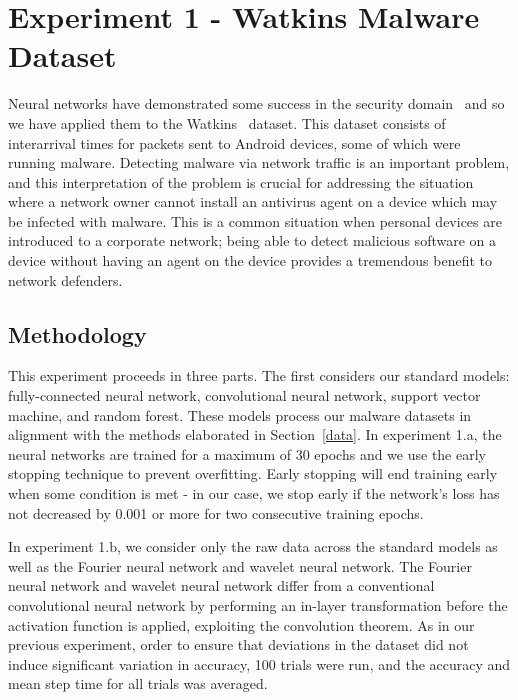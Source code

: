\chapter{Experiment 1 - Watkins Malware Dataset}
\label{chap:three}
Neural networks have demonstrated some success in the security domain~\cite{raff2018malware} and so we have applied them to the Watkins~\cite{watkins2013using} dataset.
This dataset consists of interarrival times for packets sent to Android devices, some of which were running malware.
Detecting malware via network traffic is an important problem, and this interpretation of the problem is crucial for addressing the situation where a network owner cannot install an antivirus agent on a device which may be infected with malware.
This is a common situation when personal devices are introduced to a corporate network; being able to detect malicious software on a device without having an agent on the device provides a tremendous benefit to network defenders.

\section{Methodology}
This experiment proceeds in three parts.
The first considers our standard models: fully-connected neural network, convolutional neural network, support vector machine, and random forest.
These models process our malware datasets in alignment with the methods elaborated in Section~\ref{data}.
In experiment 1.a, the neural networks are trained for a maximum of 30 epochs and we use the early stopping technique to prevent overfitting.
Early stopping will end training early when some condition is met - in our case, we stop early if the network's loss has not decreased by 0.001 or more for two consecutive training epochs.

In experiment 1.b, we consider only the raw data across the standard models as well as the Fourier neural network and wavelet neural network.
The Fourier neural network and wavelet neural network differ from a conventional convolutional neural network by performing an in-layer transformation before the activation function is applied, exploiting the convolution theorem.
As in our previous experiment, order to ensure that deviations in the dataset did not induce significant variation in accuracy, 100 trials were run, and the accuracy and mean step time for all trials was averaged.

